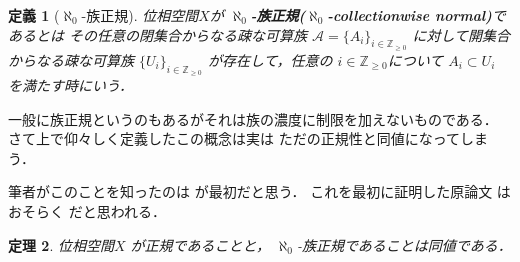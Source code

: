 \documentclass[leqno, a4paper, 12pt]{jsarticle}
\newtheorem{thm}{定理}
\newtheorem{df}[thm]{定義}
\newcommand{\zz}{\mathbb{Z}}
\begin{document}
\begin{df}[$\aleph_{0}$-族正規]
位相空間$X$が
\textbf{$\aleph_{0}$-族正規($\aleph_{0}$-collectionwise normal)}であるとは
その任意の閉集合からなる疎な可算族
$\mathcal{A}=\{A_{i}\}_{i\in \zz_{\ge 0}}$
に対して開集合からなる疎な可算族
$\{U_{i}\}_{i\in \zz_{\ge 0}}$
が存在して，任意の
$i\in \zz_{\ge 0}$について
$A_{i}\subset U_{i}$
を満たす時にいう．
\end{df}
一般に族正規というのもあるがそれは族の濃度に制限を加えないものである．
さて上で仰々しく定義したこの概念は実は
ただの正規性と同値になってしまう．

筆者がこのことを知ったのは
\cite{dm1}
が最初だと思う．
これを最初に証明した原論文
はおそらく
\cite{MR0063018}だと思われる．

\begin{thm}\label{thm:alephcn}
位相空間$X$
が正規であることと，
$\aleph_{0}$-族正規であることは同値である．
\end{thm}
\end{document}
